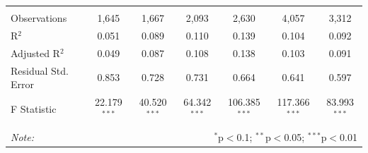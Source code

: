 \documentclass[12pt,a4paper]{article}
\numberwithin{equation}{section}
\begin{document}
\begin{table}[!htbp]
\begin{tabular}{@{\extracolsep{5pt}}lcccccc}
  & & & & & & \\ 
\hline \\[-1.8ex] 
Observations & 1,645 & 1,667 & 2,093 & 2,630 & 4,057 & 3,312 \\ 
R$^{2}$ & 0.051 & 0.089 & 0.110 & 0.139 & 0.104 & 0.092 \\ 
Adjusted R$^{2}$ & 0.049 & 0.087 & 0.108 & 0.138 & 0.103 & 0.091 \\ 
Residual Std. Error & 0.853 & 0.728 & 0.731 & 0.664 & 0.641 & 0.597 \\ 
F Statistic & 22.179$^{***}$ & 40.520$^{***}$ & 64.342$^{***}$ & 106.385$^{***}$ & 117.366$^{***}$ & 83.993$^{***}$ \\ 
\hline 
\hline \\[-1.8ex] 
\textit{Note:}  & \multicolumn{6}{r}{$^{*}$p$<$0.1; $^{**}$p$<$0.05; $^{***}$p$<$0.01} \\ 
\end{tabular} 
\end{table} 
\end{document}
